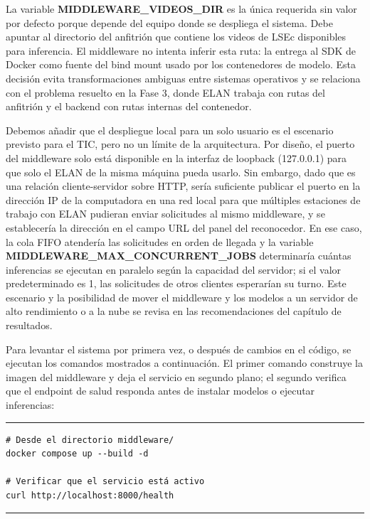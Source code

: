 \documentclass[11pt,a4paper]{article}
\begin{document}
La variable \textbf{MIDDLEWARE\_VIDEOS\_DIR} es la única requerida sin valor por defecto porque depende del equipo donde se despliega el sistema. Debe apuntar al directorio del anfitrión que contiene los videos de LSEc disponibles para inferencia. El middleware no intenta inferir esta ruta: la entrega al SDK de Docker como fuente del bind mount usado por los contenedores de modelo. Esta decisión evita transformaciones ambiguas entre sistemas operativos y se relaciona con el problema resuelto en la Fase 3, donde ELAN trabaja con rutas del anfitrión y el backend con rutas internas del contenedor.

Debemos añadir que el despliegue local para un solo usuario es el escenario previsto para el TIC, pero no un límite de la arquitectura. Por diseño, el puerto del middleware solo está disponible en la interfaz de loopback (127.0.0.1) para que solo el ELAN de la misma máquina pueda usarlo. Sin embargo, dado que es una relación cliente-servidor sobre HTTP, sería suficiente publicar el puerto en la dirección IP de la computadora en una red local para que múltiples estaciones de trabajo con ELAN pudieran enviar solicitudes al mismo middleware, y se establecería la dirección en el campo URL del panel del reconocedor. En ese caso, la cola FIFO atendería las solicitudes en orden de llegada y la variable \textbf{MIDDLEWARE\_MAX\_CONCURRENT\_JOBS} determinaría cuántas inferencias se ejecutan en paralelo según la capacidad del servidor; si el valor predeterminado es 1, las solicitudes de otros clientes esperarían su turno. Este escenario y la posibilidad de mover el middleware y los modelos a un servidor de alto rendimiento o a la nube se revisa en las recomendaciones del capítulo de resultados.

Para levantar el sistema por primera vez, o después de cambios en el código, se ejecutan los comandos mostrados a continuación. El primer comando construye la imagen del middleware y deja el servicio en segundo plano; el segundo verifica que el endpoint de salud responda antes de instalar modelos o ejecutar inferencias:

\begin{center}
\begin{minipage}{0.78\textwidth}
\hrule
\vspace{0.10cm}
\footnotesize
\begin{Verbatim}[baselinestretch=0.78]
# Desde el directorio middleware/
docker compose up --build -d

# Verificar que el servicio está activo
curl http://localhost:8000/health
\end{Verbatim}
\vspace{0.03cm}
\hrule

\label{lst:comandos_despliegue_middleware}
\end{minipage}
\end{center}
\end{document}
